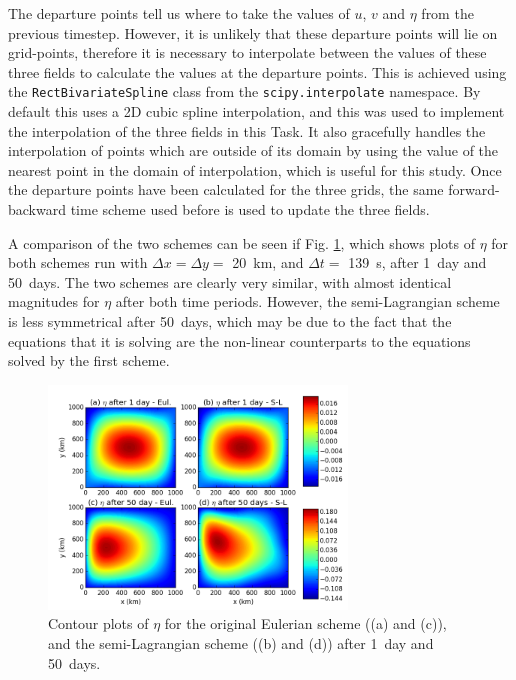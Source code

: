 \documentclass{article}
\begin{document}
The departure points tell us where to take the values of $u$, $v$ and $\eta$ from the previous
timestep. However, it is unlikely that these departure points will lie on grid-points, therefore it
is necessary to interpolate between the values of these three fields to calculate the values at the
departure points. This is achieved using the \lstinline[basicstyle=\ttfamily]|RectBivariateSpline|
class from the \lstinline[basicstyle=\ttfamily]|scipy.interpolate| namespace. By default this uses a
2D cubic spline interpolation, and this was used to implement the interpolation of the three fields
in this Task. It also gracefully handles the interpolation of points which are outside of its domain
by using the value of the nearest point in the domain of interpolation, which is useful for this
study. Once the departure points have been calculated for the three grids, the same forward-backward
time scheme used before is used to update the three fields. 

A comparison of the two schemes can be seen if Fig. \ref{fig:task_d_eta}, which shows plots of
$\eta$ for both schemes run with $\Delta x = \Delta y = $ \SI{20}{km}, and $\Delta t = $
\SI{139}{s}, after \SI{1}{day} and \SI{50}{days}. The two schemes are clearly very similar, with
almost identical magnitudes for $\eta$ after both time periods. However, the semi-Lagrangian scheme
is less symmetrical after \SI{50}{days}, which may be due to the fact that the equations that it is
solving are the non-linear counterparts to the equations solved by the first scheme.

\begin{figure}[ht!]
    \centering
    \includegraphics[width=300px]{figures/task_d_eta}
    \caption{Contour plots of $\eta$ for the original Eulerian scheme ((a) and (c)), and the
	semi-Lagrangian scheme ((b) and (d)) after \SI{1}{day} and \SI{50}{days}.}
    \label{fig:task_d_eta}
\end{figure}
\end{document}
